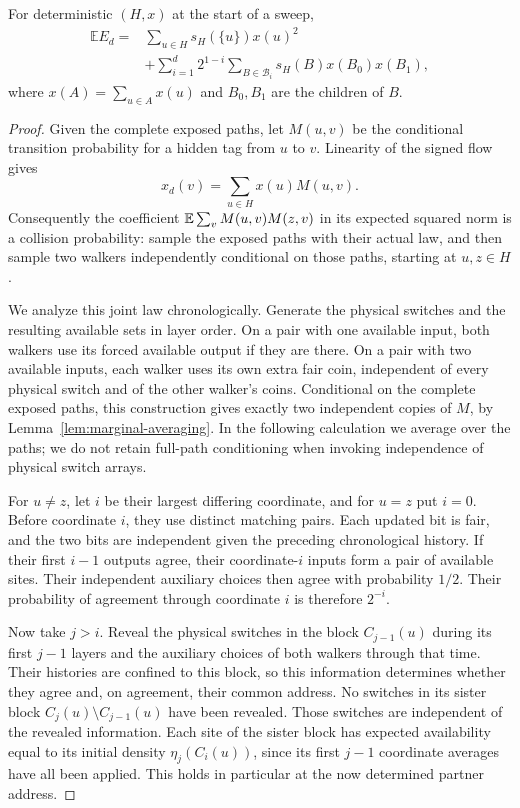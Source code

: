 \begin{lemma}\label{sweeps:collision}
For deterministic $(H,x)$ at the start of a sweep,
\begin{align}\label{sweeps:collision-eq}
 \mathbb E E_d={}&\sum_{u\in H}s_H(\{u\})x(u)^2\\
 &+\sum_{i=1}^d2^{1-i}\sum_{B\in\mathcal B_i}
          s_H(B)x(B_0)x(B_1),\nonumber
\end{align}
where $x(A)=\sum_{u\in A}x(u)$ and $B_0,B_1$ are the children of $B$.
\end{lemma}
\begin{proof}
Given the complete exposed paths, let $M(u,v)$ be the conditional
transition probability for a hidden tag from $u$ to $v$. Linearity of
the signed flow gives
\[
 x_d(v)=\sum_{u\in H}x(u)M(u,v).
\]
Consequently the coefficient
$\mathbb E\sum_vM(u,v)M(z,v)$ in its expected squared norm is a collision
probability: sample the exposed paths with their actual law, and then
sample two walkers independently conditional on those paths, starting
at $u,z\in H$.

We analyze this joint law chronologically. Generate the physical
switches and the resulting available sets in layer order. On a pair
with one available input, both walkers use its forced available
output if they are there. On a pair with two available inputs, each
walker uses its own extra fair coin, independent of every physical
switch and of the other walker's coins. Conditional on the complete
exposed paths, this construction gives exactly two independent copies
of $M$, by Lemma~\ref{lem:marginal-averaging}. In the following
calculation we average over the paths; we do not retain full-path
conditioning when invoking independence of physical switch arrays.

For $u\ne z$, let $i$ be their largest differing coordinate, and for
$u=z$ put $i=0$. Before coordinate $i$, they use distinct matching
pairs. Each updated bit is fair, and the two bits are independent
given the preceding chronological history. If their first $i-1$
outputs agree, their coordinate-$i$ inputs form a pair of available
sites. Their independent auxiliary choices then agree with probability
$1/2$. Their probability of agreement through coordinate $i$ is
therefore $2^{-i}$.

Now take $j>i$. Reveal the physical switches in the block
$C_{j-1}(u)$ during its first $j-1$ layers and the auxiliary choices
of both walkers through that time. Their histories are confined to
this block, so this information determines whether they agree and,
on agreement, their common address. No switches in its sister block
$C_j(u)\setminus C_{j-1}(u)$ have been revealed. Those switches are
independent of the revealed information. Each site of the sister
block has expected availability equal to its initial density
$\eta_j(C_i(u))$, since its first $j-1$ coordinate averages have
all been applied. This holds in particular at the now determined
partner address.


\end{proof}
